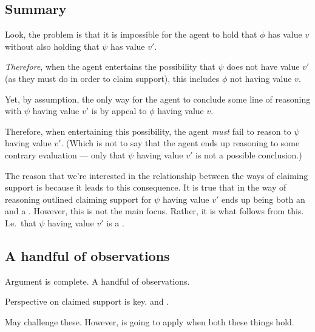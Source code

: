 \subsection{Summary}

\begin{note}[To summarise]
  Look, the problem is that it is impossible for the agent to hold that \(\phi\) has value \(v\) without also holding that \(\psi\) has value \(v'\).

  \emph{Therefore}, when the agent entertains the possibility that \(\psi\) does not have value \(v'\) (as they must do in order to claim support), this includes \(\phi\) not having value \(v\).

  Yet, by assumption, the only way for the agent to conclude some line of reasoning with \(\psi\) having value \(v'\) is by appeal to \(\phi\) having value \(v\).

  Therefore, when entertaining this possibility, the agent \emph{must} fail to reason to \(\psi\) having value \(v'\).
  (Which is not to say that the agent ends up reasoning to some contrary evaluation --- only that \(\psi\) having value \(v'\) is not a possible conclusion.)

  The reason that we're interested in the relationship between the ways of claiming support is because it leads to this consequence.
  It is true that in the way of reasoning outlined claiming support for \(\psi\) having value \(v'\) ends up being both an \expec{} and a \requ{}.
  However, this is not the main focus.
  Rather, it is what follows from this.
  I.e.\ that \(\psi\) having value \(v'\) is a \requ{}.
\end{note}

\newpage

\subsection*{A handful of observations}

\begin{note}
  Argument is complete.
  A handful of observations.
\end{note}

\begin{note}
  Perspective on claimed support is key.
  \nfcs{} and \eiS{}.

  May challenge these.
  However, \nI{} is going to apply when both these things hold.
\end{note}

